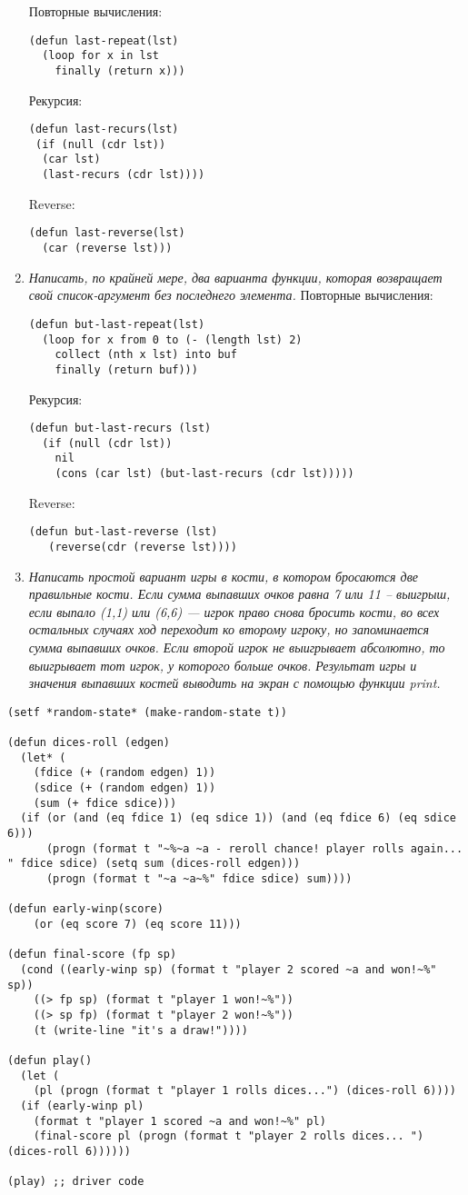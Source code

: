 \begin{enumerate}[wide=0pt]
Повторные вычисления:
\begin{lstlisting}
(defun last-repeat(lst)
  (loop for x in lst
    finally (return x)))
\end{lstlisting}
Рекурсия:
\begin{lstlisting}
(defun last-recurs(lst)
 (if (null (cdr lst))
  (car lst)
  (last-recurs (cdr lst))))
\end{lstlisting}
Reverse:
\begin{lstlisting}
(defun last-reverse(lst) 
  (car (reverse lst)))
\end{lstlisting}
\item \textit{Написать, по крайней мере, два варианта функции, которая возвращает свой список-аргумент без последнего элемента.}
Повторные вычисления:
\begin{lstlisting}
(defun but-last-repeat(lst)
  (loop for x from 0 to (- (length lst) 2)
    collect (nth x lst) into buf
    finally (return buf)))
\end{lstlisting}
Рекурсия:
\begin{lstlisting}
(defun but-last-recurs (lst)
  (if (null (cdr lst))
    nil
    (cons (car lst) (but-last-recurs (cdr lst)))))
\end{lstlisting}
Reverse:
\begin{lstlisting}
(defun but-last-reverse (lst) 
   (reverse(cdr (reverse lst))))
\end{lstlisting}
\item \textit{ Написать простой вариант игры в кости, в котором бросаются две правильные кости. Если сумма выпавших очков равна 7 или 11 -- выигрыш, если выпало (1,1) или (6,6) --- игрок право снова бросить кости, во всех остальных случаях ход переходит ко второму игроку, но запоминается сумма выпавших очков. Если второй игрок не выигрывает абсолютно, то выигрывает тот игрок, у которого больше очков. Результат игры и значения выпавших костей выводить на экран с помощью функции print.}
\end{enumerate}
\begin{lstlisting}
(setf *random-state* (make-random-state t))

(defun dices-roll (edgen)
  (let* (
    (fdice (+ (random edgen) 1))
    (sdice (+ (random edgen) 1))
    (sum (+ fdice sdice)))
  (if (or (and (eq fdice 1) (eq sdice 1)) (and (eq fdice 6) (eq sdice 6)))
      (progn (format t "~%~a ~a - reroll chance! player rolls again... " fdice sdice) (setq sum (dices-roll edgen)))
      (progn (format t "~a ~a~%" fdice sdice) sum))))

(defun early-winp(score)
    (or (eq score 7) (eq score 11)))

(defun final-score (fp sp)
  (cond ((early-winp sp) (format t "player 2 scored ~a and won!~%" sp))
    ((> fp sp) (format t "player 1 won!~%"))
    ((> sp fp) (format t "player 2 won!~%"))
    (t (write-line "it's a draw!"))))

(defun play() 
  (let (
    (pl (progn (format t "player 1 rolls dices...") (dices-roll 6))))
  (if (early-winp pl)
    (format t "player 1 scored ~a and won!~%" pl)
    (final-score pl (progn (format t "player 2 rolls dices... ") (dices-roll 6))))))

(play) ;; driver code
\end{lstlisting}